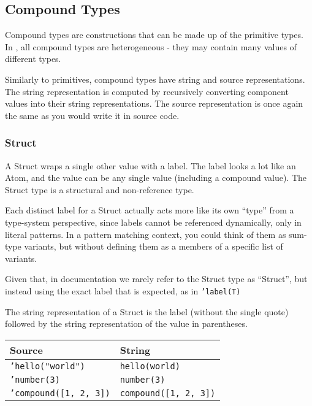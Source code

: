 \subsection{Compound Types}
\label{sec:compound-types}

Compound types are constructions that can be made up of the primitive
types. In \Trilogy{}, all compound types are heterogeneous - they may
contain many values of different types.

Similarly to primitives, compound types have string and source
representations. The string representation is computed by recursively
converting component values into their string representations. The
source representation is once again the same as you would write it
in source code.

\subsubsection{Struct}

A Struct wraps a single other value with a label. The label looks a
lot like an Atom, and the value can be any single value (including
a compound value). The Struct type is a structural and non-reference
type.

Each distinct label for a Struct actually acts more like its own ``type'' from
a type-system perspective, since labels cannot be referenced dynamically, only
in literal patterns. In a pattern matching context, you could think of them as
sum-type variants, but without defining them as a members of a specific list
of variants.

Given that, in documentation we rarely refer to the Struct type as ``Struct'',
but instead using the exact label that is expected, as in \texttt{'label(T)}

The string representation of a Struct is the label (without the single quote)
followed by the string representation of the value in parentheses.

\begin{table}[H]
    \centering
    \begin{tabular}{ll}
        \hline
        \textbf{Source} & \textbf{String} \\
        \hline
        \texttt{'hello("world")} & \texttt{hello(world)} \\
        \texttt{'number(3)} & \texttt{number(3)} \\
        \texttt{'compound([1, 2, 3])} & \texttt{compound([1, 2, 3])} \\
        \hline
    \end{tabular}
\end{table}

